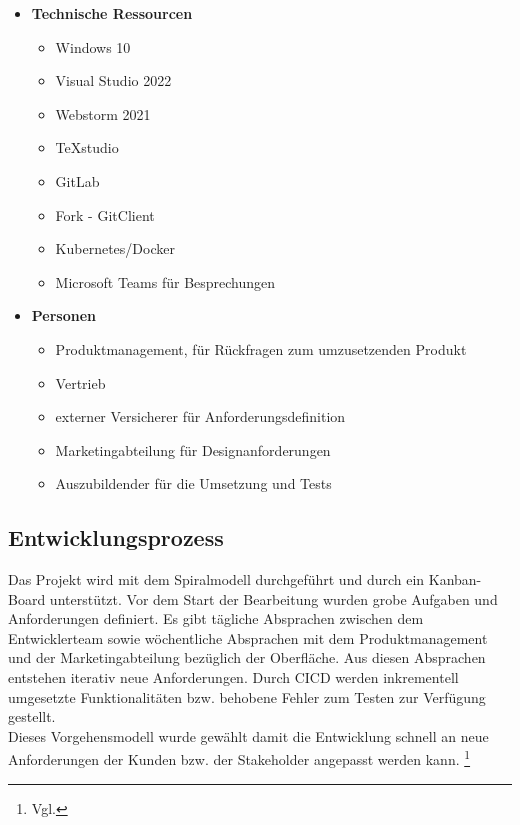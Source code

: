 \begin{itemize}
	\item \textbf{Technische Ressourcen}
	\begin{itemize}
		\item Windows 10
		\item Visual Studio 2022
		\item Webstorm 2021
		\item TeXstudio
		\item GitLab
		\item Fork - GitClient
		\item Kubernetes/Docker
		\item Microsoft Teams für Besprechungen
	\end{itemize}
	\item \textbf{Personen}
	\begin{itemize}
	 	\item Produktmanagement, für Rückfragen zum umzusetzenden Produkt
	 	\item Vertrieb
	 	\item externer Versicherer für Anforderungsdefinition
		\item Marketingabteilung für Designanforderungen
		\item Auszubildender für die Umsetzung und Tests
	\end{itemize}
\end{itemize}

\subsection{Entwicklungsprozess}
\label{entwicklungsprozess}
Das Projekt wird mit dem Spiralmodell durchgeführt und durch ein Kanban-Board unterstützt. Vor dem Start der Bearbeitung wurden grobe Aufgaben und Anforderungen definiert. Es gibt tägliche Absprachen zwischen dem Entwicklerteam sowie wöchentliche Absprachen mit dem Produktmanagement und der Marketingabteilung bezüglich der Oberfläche. Aus diesen Absprachen entstehen iterativ neue Anforderungen. Durch \ac{CICD} werden inkrementell umgesetzte Funktionalitäten bzw. behobene Fehler zum Testen zur Verfügung gestellt. \\
Dieses Vorgehensmodell wurde gewählt damit die Entwicklung schnell an neue Anforderungen der Kunden bzw. der Stakeholder angepasst werden kann. \footnote{Vgl.\cite{Spiralmodell19}}